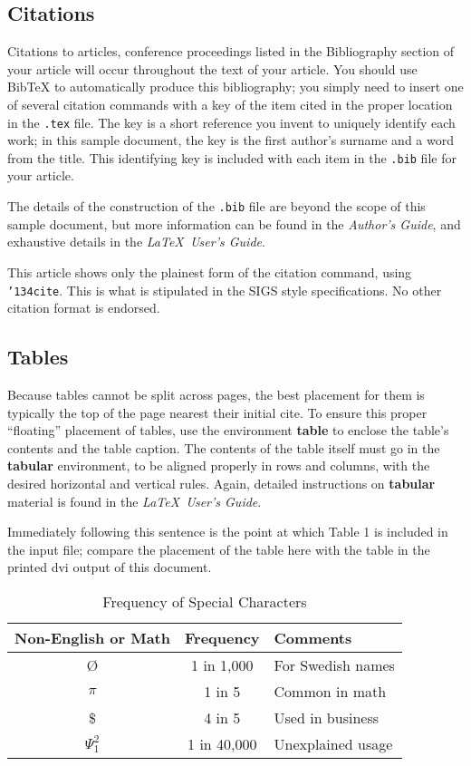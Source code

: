 \documentclass{acm_proc_article-sp}
\begin{document}
\subsection{Citations}
Citations to articles,
conference
proceedings listed
in the Bibliography section of your
article will occur throughout the text of your article.
You should use BibTeX to automatically produce this bibliography;
you simply need to insert one of several citation commands with
a key of the item cited in the proper location in
the \texttt{.tex} file.
The key is a short reference you invent to uniquely
identify each work; in this sample document, the key is
the first author's surname and a
word from the title.  This identifying key is included
with each item in the \texttt{.bib} file for your article.

The details of the construction of the \texttt{.bib} file
are beyond the scope of this sample document, but more
information can be found in the \textit{Author's Guide},
and exhaustive details in the \textit{\LaTeX\ User's
Guide}.

This article shows only the plainest form
of the citation command, using \texttt{{\char'134}cite}.
This is what is stipulated in the SIGS style specifications.
No other citation format is endorsed.

\subsection{Tables}
Because tables cannot be split across pages, the best
placement for them is typically the top of the page
nearest their initial cite.  To
ensure this proper ``floating'' placement of tables, use the
environment \textbf{table} to enclose the table's contents and
the table caption.  The contents of the table itself must go
in the \textbf{tabular} environment, to
be aligned properly in rows and columns, with the desired
horizontal and vertical rules.  Again, detailed instructions
on \textbf{tabular} material
is found in the \textit{\LaTeX\ User's Guide}.

Immediately following this sentence is the point at which
Table 1 is included in the input file; compare the
placement of the table here with the table in the printed
dvi output of this document.

\begin{table}
\centering
\caption{Frequency of Special Characters}
\begin{tabular}{|c|c|l|} \hline
Non-English or Math&Frequency&Comments\\ \hline
\O & 1 in 1,000& For Swedish names\\ \hline
$\pi$ & 1 in 5& Common in math\\ \hline
\$ & 4 in 5 & Used in business\\ \hline
$\Psi^2_1$ & 1 in 40,000& Unexplained usage\\
\hline\end{tabular}
\end{table}
\end{document}
